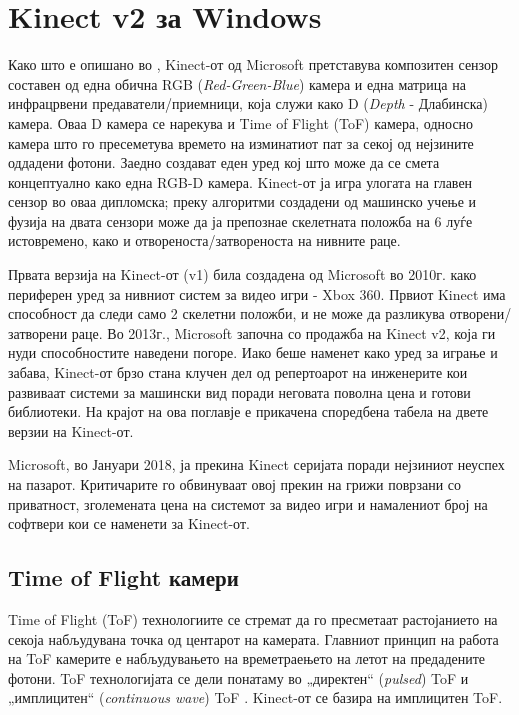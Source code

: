 \documentclass[11pt]{article}
\begin{document}
\newpage

\section{Kinect v2 за Windows}
	Како што е опишано во \cite{wassenmuller}, Kinect-от од Microsoft претставува композитен сензор составен од една обична RGB (\textit{Red-Green-Blue}) камера и една матрица на инфрацрвени предаватели/приемници, која служи како D (\textit{Depth} - Длабинска) камера. Оваа D камера се нарекува и Time of Flight (ToF) камера, односно камера што го пресеметува времето на изминатиот пат за секој од нејзините оддадени фотони. Заедно создават еден уред кој што може да се смета концептуално како една RGB-D камера. Kinect-от ја игра улогата на главен сензор во оваа дипломска; преку алгоритми создадени од машинско учење и фузија на двата сензори може да ја препознае скелетната положба на 6 луѓе истовремено, како и отвореноста/затвореноста на нивните раце.

	Првата верзија на Kinect-от (v1) била создадена од Microsoft во 2010г. како периферен уред за нивниот систем за видео игри - Xbox 360. Првиот Kinect има способност да следи само 2 скелетни положби, и не може да разликува отворени/затворени раце. Во 2013г., Microsoft започна со продажба на Kinect v2, која ги нуди способностите наведени погоре. Иако беше наменет како уред за играње и забава, Kinect-от брзо стана клучен дел од репертоарот на инженерите кои развиваат системи за машински вид поради неговата поволна цена и готови библиотеки. На крајот на ова поглавје е прикачена споредбена табела на двете верзии на Kinect-от.

  Microsoft, во Јануари 2018, ја прекина Kinect серијата поради нејзиниот неуспех на пазарот. Критичарите го обвинуваат овој прекин на грижи поврзани со приватност, зголемената цена на системот за видео игри и намалениот број на софтвери кои се наменети за Kinect-от.

  \subsection{Time of Flight камери}
  	Time of Flight (ToF) технологиите се стремат да го пресметаат растојанието на секоја набљудувана точка од центарот на камерата. Главниот принцип на работа на ToF камерите е набљудувањето на времетраењето на летот на предадените фотони. ToF технологијата се дели понатаму во „директен“ (\textit{pulsed}) ToF и „имплицитен“ (\textit{continuous wave}) ToF \cite{tofwhitepaper}. Kinect-от се базира на имплицитен ToF.
\end{document}
